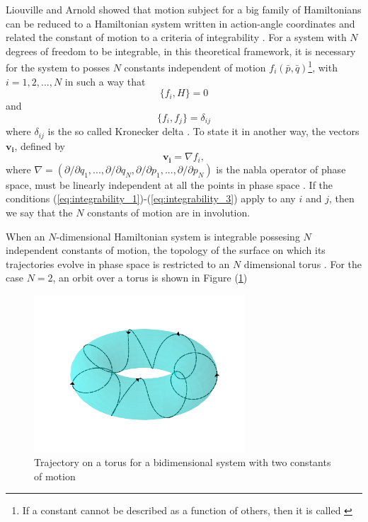 Liouville and Arnold showed that motion subject for a big family of Hamiltonians can be reduced to a Hamiltonian system written in action-angle coordinates and related the constant of motion to a criteria of integrability \cite{arnol2013mathematical}. For a system with $N$ degrees of freedom to be integrable, in this theoretical framework, it is necessary for the system to posses $N$ constants independent of motion $f_i(\bar{p},\bar{q})$\footnote{If a constant cannot be described as a function of others, then it is called  \cite{ott_chaos_2002}}, with $i=1,2,...,N$ in such a way that
\begin{equation}
\{f_i,H\}=0
\label{eq:integrability_1}
\end{equation}
and 
\begin{equation}
\{f_i,f_j\}=\delta_{ij}
\label{eq:integrability_2}
\end{equation}
where $\delta_{ij}$ is the so called Kronecker delta \cite{zaslavsky2005hamiltonian}. To state it in another way, the vectors $\bm{v_i}$, defined by
\begin{equation}
\bm{v_i}=\nabla f_i,
\label{eq:integrability_3}
\end{equation}
where $\nabla=(\partial/\partial q_1,...,\partial/\partial q_N,\partial/\partial p_1,...,\partial/\partial p_N)$ is the nabla operator of phase space, must be linearly independent at all the points in phase space  \cite{goldstein2002classical}. If the conditions (\ref{eq:integrability_1})-(\ref{eq:integrability_3}) apply to any $i$ and $j$, then we say that the $N$ constants of motion are in involution.\par 

When an $N$-dimensional Hamiltonian system is integrable possesing $N$ independent constants of motion, the topology of the surface on which its trajectories evolve in phase space is restricted to an $N$ dimensional torus \cite{zaslavsky2005hamiltonian}. For the case $N=2$, an orbit over a torus is shown in Figure (\ref{fig:trajectory_torus})

\begin{figure}[H]
\centering
\includegraphics[width=0.7\textwidth]{Figures/trajectory_torus.png}
\caption{Trajectory on a torus for a bidimensional system with two constants of motion}
\label{fig:trajectory_torus}
\end{figure}

